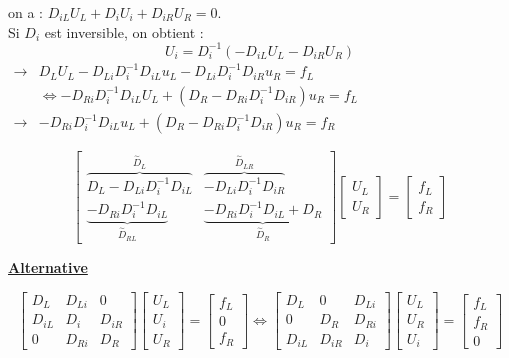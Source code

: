 \documentclass[12pt,a4paper]{article}
\begin{document}
	\begin{sol}
		on a : $D_{iL} U_L + D_iU_i + D_{iR}U_R = 0$.\\
		Si $D_i$ est inversible, on obtient  :
		\[
		U_i = D_i^{-1}\left(-D_{iL}U_L-D_{iR}U_R\right)
		\]
		$\begin{aligned}
			\to & D_LU_L - D_{Li}D_i^{-1}D_{iL}u_L-D_{Li}D_i^{-1}D_{iR}u_R = f_L\\
			& \iff -D_{Ri}D_i^{-1}D_{iL}U_L + (D_R-D_{Ri}D_i^{-1}D_{iR})u_R = f_L\\
			\to & -D_{Ri}D_i^{-1}D_{iL}u_L + (D_R-D_{Ri}D_i^{-1}D_{iR})u_R = f_R
		\end{aligned}$
		
		\[
		\left[\begin{matrix}
			\overbrace{D_L-D_{Li}D_i^{-1}D_{iL}}^{\overset\sim D_L} & \overbrace{-D_{Li}D_i^{-1}D_{iR}}^{\overset\sim D_{LR}} \\
			\underbrace{-D_{Ri}D_i^{-1}D_{iL}}_{\overset\sim D_{RL}} & \underbrace{-D_{Ri}D_i^{-1}D_{iL} + D_R}_{\overset\sim D_R}
		\end{matrix}\right] \left[\begin{matrix}
			U_L \\
			U_R
		\end{matrix}\right] = \left[\begin{matrix}
			f_L \\ f_R
		\end{matrix}\right]
		\]
		
		\textbf{\underline{Alternative}}
		
		\[
		\left[\begin{matrix}
			D_L & D_{Li} & 0 \\
			D_{iL} & D_i & D_{iR} \\
			0 & D_{Ri} & D_R
		\end{matrix}\right]\left[\begin{matrix}
			U_L \\ U_i \\ U_R
		\end{matrix}\right] = \left[\begin{matrix}
			f_L \\ 0 \\ f_R
		\end{matrix}\right] \iff \left[\begin{matrix}
			D_L & 0 & D_{Li} \\
			0 & D_R & D_{Ri} \\
			D_{iL} & D_{iR} & D_i
		\end{matrix}\right]\left[\begin{matrix}
			U_L \\ U_R \\ U_i
		\end{matrix}\right] = \left[\begin{matrix}
			f_L \\ f_R \\ 0
		\end{matrix}\right]
		\]
		

\end{sol}
\end{document}
